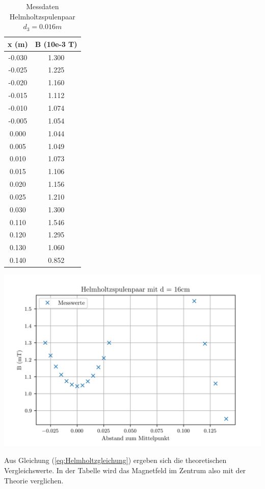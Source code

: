 \begin{table}
  \centering
  \caption{Messdaten Helmholtzspulenpaar $d_{3} = 0.016m$}
  \begin{tabular}{c c}
    \toprule
     x (m) &  B (10e-3 T) \\
    \midrule
    -0.030 &        1.300 \\
    -0.025 &        1.225 \\
    -0.020 &        1.160 \\
    -0.015 &        1.112 \\
    -0.010 &        1.074 \\
    -0.005 &        1.054 \\
     0.000 &        1.044 \\
     0.005 &        1.049 \\
     0.010 &        1.073 \\
     0.015 &        1.106 \\
     0.020 &        1.156 \\
     0.025 &        1.210 \\
     0.030 &        1.300 \\
     0.110 &        1.546 \\
     0.120 &        1.295 \\
     0.130 &        1.060 \\
     0.140 &        0.852 \\
    \bottomrule
  \end{tabular}
\end{table}

  \includegraphics[width=\textwidth]{pictures/Helmholtz3.png}    %

  Aus Gleichung (\ref{eq:Helmholtzgleichung}) ergeben sich die theoretischen Vergleichswerte.
  In der Tabelle wird das Magnetfeld im Zentrum also mit der Theorie verglichen.

